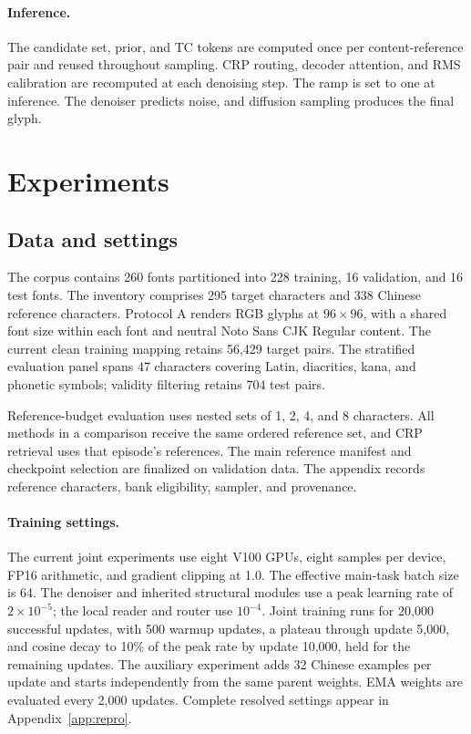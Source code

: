 \documentclass{article}
\begin{document}
\paragraph{Inference.}
The candidate set, prior, and TC tokens are computed once per content-reference pair and reused throughout sampling.
CRP routing, decoder attention, and RMS calibration are recomputed at each denoising step.
The ramp is set to one at inference.
The denoiser predicts noise, and diffusion sampling produces the final glyph.

\section{Experiments}
\label{sec:experiments}
\subsection{Data and settings}
The corpus contains 260 fonts partitioned into 228 training, 16 validation, and 16 test fonts.
The inventory comprises 295 target characters and 338 Chinese reference characters.
Protocol A renders RGB glyphs at $96\times96$, with a shared font size within each font and neutral Noto Sans CJK Regular content.
The current clean training mapping retains 56,429 target pairs.
The stratified evaluation panel spans 47 characters covering Latin, diacritics, kana, and phonetic symbols; validity filtering retains 704 test pairs.

Reference-budget evaluation uses nested sets of 1, 2, 4, and 8 characters.
All methods in a comparison receive the same ordered reference set, and CRP retrieval uses that episode's references.
The main reference manifest and checkpoint selection are finalized on validation data.
The appendix records reference characters, bank eligibility, sampler, and provenance.

\paragraph{Training settings.}
The current joint experiments use eight V100 GPUs, eight samples per device, FP16 arithmetic, and gradient clipping at 1.0.
The effective main-task batch size is 64.
The denoiser and inherited structural modules use a peak learning rate of $2\times10^{-5}$; the local reader and router use $10^{-4}$.
Joint training runs for 20,000 successful updates, with 500 warmup updates, a plateau through update 5,000, and cosine decay to 10\% of the peak rate by update 10,000, held for the remaining updates.
The auxiliary experiment adds 32 Chinese examples per update and starts independently from the same parent weights.
EMA weights are evaluated every 2,000 updates.
Complete resolved settings appear in Appendix~\ref{app:repro}.
\end{document}
